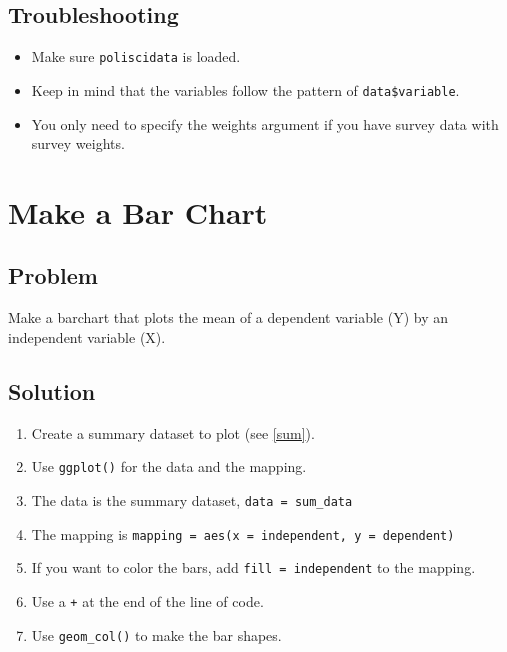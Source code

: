 \documentclass[
]{book}
\providecommand{\tightlist}{%
  \setlength{\itemsep}{0pt}\setlength{\parskip}{0pt}}
\begin{document}
\hypertarget{troubleshooting-11}{%
\subsection{Troubleshooting}\label{troubleshooting-11}}

\begin{itemize}
\tightlist
\item
  Make sure \texttt{poliscidata} is loaded.
\item
  Keep in mind that the variables follow the pattern of \texttt{data\$variable}.
\item
  You only need to specify the weights argument if you have survey data with survey weights.
\end{itemize}

\hypertarget{barchart}{%
\section{Make a Bar Chart}\label{barchart}}

\hypertarget{problem-15}{%
\subsection{Problem}\label{problem-15}}

Make a barchart that plots the mean of a dependent variable (Y) by an independent variable (X).

\hypertarget{solution-15}{%
\subsection{Solution}\label{solution-15}}

\begin{enumerate}
\def\labelenumi{\arabic{enumi}.}
\tightlist
\item
  Create a summary dataset to plot (see \ref{sum}).
\item
  Use \texttt{ggplot()} for the data and the mapping.
\item
  The data is the summary dataset, \texttt{data\ =\ sum\_data}
\item
  The mapping is \texttt{mapping\ =\ aes(x\ =\ independent,\ y\ =\ dependent)}
\item
  If you want to color the bars, add \texttt{fill\ =\ independent} to the mapping.
\item
  Use a \texttt{+} at the end of the line of code.
\item
  Use \texttt{geom\_col()} to make the bar shapes.
\end{enumerate}
\end{document}
